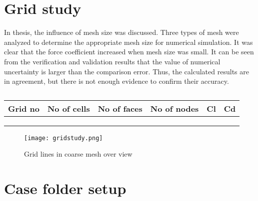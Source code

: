 \section{Grid study}
In thesis, the influence of mesh size was discussed. Three types of mesh were analyzed to 
determine the appropriate mesh size for numerical simulation. It was clear that the force coefficient increased when
mesh size was small. It can be seen from the verification and validation results that the value of numerical 
uncertainty is larger than the comparison error. Thus, the calculated results are in agreement, but there 
is not enough evidence to confirm their accuracy.
\begin{table}[h]
\centering
\begin{tabular}{|l|l|l|l|l|l|}
\hline
 Grid no& No of cells & No of faces &No of nodes  & Cl & Cd \\ \hline
 &  &  &  &  &  \\ \hline
 &  &  &  &  &  \\ \hline
 &  &  &  &  &  \\ \hline
\end{tabular}
\caption{}
\label{}
\end{table}
\begin{figure}[H]
    \centering
    \texttt{[image: gridstudy.png]}
    \caption{Grid lines in coarse mesh over view}
    \label{fig:fig17}
\end{figure}
\section{Case folder setup}
